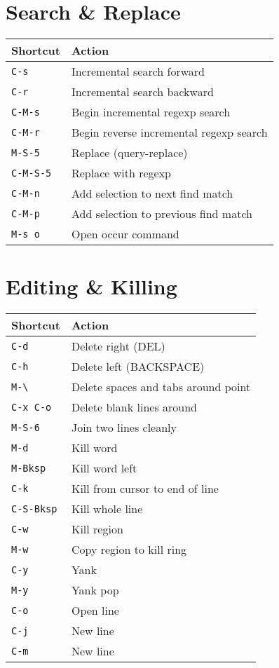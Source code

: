 \documentclass[10pt,landscape]{article}
\newcommand{\key}[1]{\textcolor{keycolor}{\texttt{#1}}}
\begin{document}
\begin{multicols}{2}
\section*{\textcolor{sectioncolor}{Search \& Replace}}

\begin{tabular}{@{}p{3cm}p{6.5cm}@{}}
\toprule
\textbf{Shortcut} & \textbf{Action} \\
\midrule
\key{C-s} & Incremental search forward \\
\key{C-r} & Incremental search backward \\
\key{C-M-s} & Begin incremental regexp search \\
\key{C-M-r} & Begin reverse incremental regexp search \\
\key{M-S-5} & Replace (query-replace) \\
\key{C-M-S-5} & Replace with regexp \\
\key{C-M-n} & Add selection to next find match \\
\key{C-M-p} & Add selection to previous find match \\
\key{M-s o} & Open occur command \\
\bottomrule
\end{tabular}

\section*{\textcolor{sectioncolor}{Editing \& Killing}}

\begin{tabular}{@{}p{3cm}p{6.5cm}@{}}
\toprule
\textbf{Shortcut} & \textbf{Action} \\
\midrule
\key{C-d} & Delete right (DEL) \\
\key{C-h} & Delete left (BACKSPACE) \\
\key{M-\textbackslash} & Delete spaces and tabs around point \\
\key{C-x C-o} & Delete blank lines around \\
\key{M-S-6} & Join two lines cleanly \\
\key{M-d} & Kill word \\
\key{M-Bksp} & Kill word left \\
\key{C-k} & Kill from cursor to end of line \\
\key{C-S-Bksp} & Kill whole line \\
\key{C-w} & Kill region \\
\key{M-w} & Copy region to kill ring \\
\key{C-y} & Yank \\
\key{M-y} & Yank pop \\
\key{C-o} & Open line \\
\key{C-j} & New line \\
\key{C-m} & New line \\
\bottomrule
\end{tabular}


\end{multicols}
\end{document}
